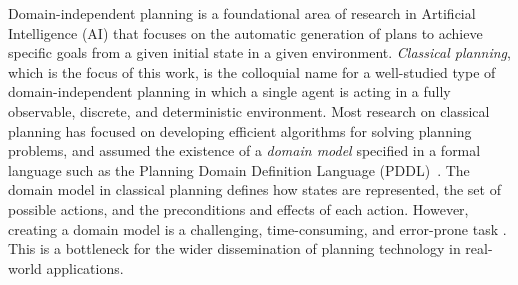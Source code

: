 \documentclass[letterpaper]{article} %
\newif\ifaddcomments
\newcommand{\roni}[1]{\ifaddcomments{\textcolor{red}{[Roni: #1]}}\fi}
\newcommand{\pascalJr}[1]{\ifaddcomments{\textcolor{cyan}{[Pascal L.: {#1}]}}\fi}
\begin{document}
Domain-independent planning is a foundational area of research in Artificial Intelligence (AI) that focuses on the automatic generation of plans to achieve specific goals from a given initial state in a given environment. 
\emph{Classical planning}, which is the focus of this work, is the colloquial name for a well-studied type of domain-independent planning in which a single agent is acting in a fully observable, discrete, and deterministic environment. 
Most research on classical planning has focused on developing efficient algorithms for solving planning problems, and assumed the existence of a \emph{domain model} specified in a formal language such as the Planning Domain Definition Language (PDDL)~\citep{mcdermott1998pddl}. 
The domain model in classical planning defines how states are represented, the set of possible actions, and the preconditions and effects of each action. 
However, creating a domain model is a challenging, time-consuming, and error-prone task \citep{DBLP:conf/kcap/McCluskeyVV17}.
This is a bottleneck for the wider dissemination of planning technology in real-world applications. 
\end{document}

